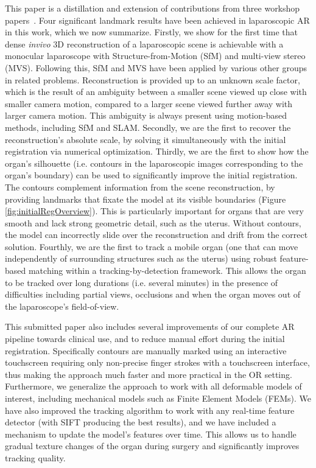 This paper is a distillation and extension of contributions from three workshop papers~\cite{Collins2044,Collins2013,Collins2017System}. Four significant landmark results have been achieved in laparoscopic AR in this work, which we now summarize. Firstly, we show for the first time that dense \textit{invivo} 3D reconstruction of a laparoscopic scene is achievable with a monocular laparoscope with Structure-from-Motion (SfM) and multi-view stereo (MVS). Following this, SfM and MVS have been applied by various other groups in related problems. Reconstruction is provided up to an unknown scale factor, which is the result of an ambiguity between a smaller scene viewed up close with smaller camera motion, compared to a larger scene viewed further away with larger camera motion. This ambiguity is always present using motion-based methods, including SfM and SLAM. %
Secondly, we are the first to recover the reconstruction's absolute scale, by solving it simultaneously with the initial registration via numerical optimization. %
Thirdly, we are the first to show how the organ's silhouette (i.e. contours in the laparoscopic images corresponding to the organ's boundary) can be used to significantly improve the initial registration. The contours complement information from the scene reconstruction, by providing landmarks that fixate the model at its visible boundaries (Figure \ref{fig:initialRegOverview}). This is particularly important for organs that are very smooth and lack strong geometric detail, such as the uterus. Without contours, the model can incorrectly slide over the reconstruction and drift from the correct solution. Fourthly, we are the first to track a mobile organ (one that can move independently of surrounding structures such as the uterus) using robust feature-based matching within a tracking-by-detection framework. This allows the organ to be tracked over long durations (i.e. several minutes) in the presence of difficulties including partial views, occlusions and when the organ moves out of the laparoscope's field-of-view. 

This submitted paper also includes several improvements of our complete AR pipeline towards clinical use, and to reduce manual effort during the initial registration. Specifically contours are manually marked using an interactive touchscreen requiring only non-precise finger strokes with a touchscreen interface, thus making the approach much faster and more practical in the OR setting. Furthermore, we generalize the approach to work with all deformable models of interest, including mechanical models such as Finite Element Models (FEMs). We have also improved the tracking algorithm to work with any real-time feature detector (with SIFT producing the best results), and we have included a mechanism to update the model's features over time. This allows us to handle gradual texture changes of the organ during surgery and significantly improves tracking quality. 


